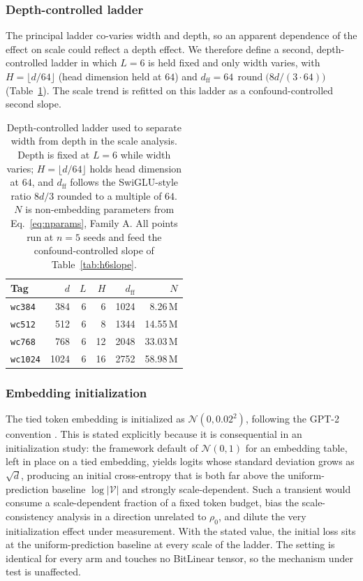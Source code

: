 \documentclass[final,5p,times,twocolumn]{elsarticle}
\theoremstyle{remark}
\newcommand{\rhoz}{\rho_{0}}
\newcommand{\round}{\operatorname{round}}
\begin{document}
\subsubsection{Depth-controlled ladder}

The principal ladder co-varies width and depth, so an apparent dependence of the
effect on scale could reflect a depth effect. We therefore define a second,
depth-controlled ladder in which $L = 6$ is held fixed and only width varies,
with $H = \lfloor d/64 \rfloor$ (head dimension held at $64$) and
$d_{\mathrm{ff}} = 64\,\round\!\big(8d/(3\cdot 64)\big)$
(Table~\ref{tab:widthctrl}). The scale trend is refitted on this ladder as a
confound-controlled second slope.

\begin{table}[t]
\centering
\small
\caption{Depth-controlled ladder used to separate width from depth in the
scale analysis. Depth is fixed at $L = 6$ while width varies;
$H = \lfloor d/64 \rfloor$ holds head dimension at $64$, and
$d_{\mathrm{ff}}$ follows the SwiGLU-style ratio $8d/3$ rounded to a multiple
of $64$. $N$ is non-embedding parameters from Eq.~\eqref{eq:nparams}, Family A.
All points run at $n = 5$ seeds and feed the confound-controlled slope of
Table~\ref{tab:h6slope}.}
\label{tab:widthctrl}
\begin{tabular}{lrrrrr}
\toprule
Tag & $d$ & $L$ & $H$ & $d_{\mathrm{ff}}$ & $N$ \\
\midrule
\texttt{wc384} & 384 & 6 & 6 & 1024 & \phantom{0}8.26\,M \\
\texttt{wc512} & 512 & 6 & 8 & 1344 & 14.55\,M \\
\texttt{wc768} & 768 & 6 & 12 & 2048 & 33.03\,M \\
\texttt{wc1024} & 1024 & 6 & 16 & 2752 & 58.98\,M \\
\bottomrule
\end{tabular}
\end{table}

\subsubsection{Embedding initialization}

The tied token embedding is initialized as
$\mathcal{N}(0, 0.02^{2})$, following the GPT-2 convention
\cite{radford2019}. This is stated
explicitly because it is consequential in an initialization study: the
framework default of $\mathcal{N}(0,1)$ for an embedding table, left in place
on a tied embedding, yields logits whose
standard deviation grows as $\sqrt{d}$, producing an initial cross-entropy that
is both far above the uniform-prediction baseline $\log|\mathcal{V}|$ and
strongly scale-dependent. Such a transient would consume a scale-dependent
fraction of a fixed token budget, bias the scale-consistency analysis in a
direction unrelated to $\rhoz$, and dilute the very initialization effect under
measurement. With the stated value, the initial loss sits at the
uniform-prediction baseline at every scale of the ladder. The setting is identical for every arm
and touches no BitLinear tensor, so the mechanism under test is unaffected.
\end{document}

